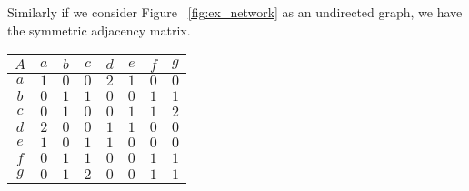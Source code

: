 \documentclass[a4paper, 10pt, twocolumn]{article}
\begin{document}
\noindent
Similarly if we consider Figure ~\ref{fig:ex_network} as an undirected graph, we have the symmetric adjacency matrix.

\begin{center}
       \begin{tabular}{c|ccccccc} 
              $ A $ & $ a $ & $ b $ & $ c $ & $ d $ & $ e $ & $ f $ & $ g $ \\
              \hline
              $ a $ & $ 1 $ & $ 0 $ & $ 0 $ & $ 2 $ & $ 1 $ & $ 0 $ & $ 0 $ \\
              $ b $ & $ 0 $ & $ 1 $ & $ 1 $ & $ 0 $ & $ 0 $ & $ 1 $ & $ 1 $ \\
              $ c $ & $ 0 $ & $ 1 $ & $ 0 $ & $ 0 $ & $ 1 $ & $ 1 $ & $ 2 $ \\
              $ d $ & $ 2 $ & $ 0 $ & $ 0 $ & $ 1 $ & $ 1 $ & $ 0 $ & $ 0 $ \\
              $ e $ & $ 1 $ & $ 0 $ & $ 1 $ & $ 1 $ & $ 0 $ & $ 0 $ & $ 0 $ \\
              $ f $ & $ 0 $ & $ 1 $ & $ 1 $ & $ 0 $ & $ 0 $ & $ 1 $ & $ 1 $ \\
              $ g $ & $ 0 $ & $ 1 $ & $ 2 $ & $ 0 $ & $ 0 $ & $ 1 $ & $ 1 $ \\
       \end{tabular}
\end{center}
\end{document}
